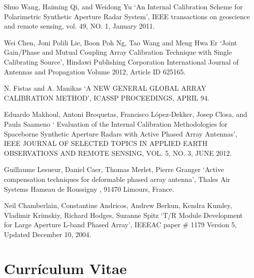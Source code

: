 \documentclass[a4paper,10pt]{article}
\begin{document}
\begin{enumerate}[ {[}1{]} ]
		\item \label{ppr:classic7} Shuo Wang, Haiming Qi, and Weidong Yu 
		\enquote*{An Internal Calibration Scheme for Polarimetric Synthetic 
		Aperture Radar System}, IEEE transactions on geoscience and remote 
		sensing, vol. 49, NO. 1, January 2011.
		
		\item \label{ppr:mutual-ext1} Wei Chen, Joni Polili Lie, Boon Poh Ng, 
		Tao Wang and Meng Hwa Er \enquote*{Joint Gain/Phase and Mutual Coupling
		Array Calibration Technique with Single Calibrating Source}, Hindawi 
		Publishing Corporation International Journal of Antennas and Propagation
		Volume 2012, Article ID 625165.

		
		\item N. Fistas and A. Manikas \enquote*{A NEW GENERAL GLOBAL ARRAY 
		CALIBRATION METHOD}, ICASSP PROCEEDINGS, APRIL 94.
		
		\item \label{ppr:classic8} Eduardo Makhoul, Antoni Broquetas, 
		Francisco López-Dekker, Josep Closa, and Paula Saameno \enquote*{
		Evaluation of the Internal Calibration Methodologies for Spaceborne 
		Synthetic Aperture Radars with Active Phased Array Antennas}, IEEE 
		JOURNAL OF SELECTED TOPICS IN APPLIED EARTH OBSERVATIONS AND REMOTE 
		SENSING, VOL. 5, NO. 3, JUNE 2012.

		\item \label{ppr:aligment6} Guillaume Lesueur, Daniel Caer, Thomas 
		Merlet, Pierre Granger \enquote*{Active compensation techniques for 
		deformable phased array antenna}, Thales Air Systems Hameau de Roussigny
		, 91470 Limours, France.

		\item Neil Chamberlain, Constantine Andricos, Andrew Berkun, Kendra 
		Kumley, Vladimir Krimskiy, Richard Hodges, Suzanne Spitz \enquote*{T/R 
		Module Development for Large Aperture L-band Phased Array}, IEEEAC paper
		\# 1179 Version 5, Updated December 10, 2004.

	\end{enumerate}

	\newpage
	\section{Currículum Vitae}
	
	\newpage
\end{document}

